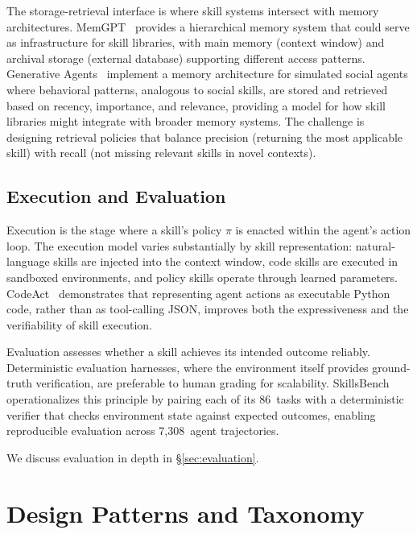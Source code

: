 \documentclass[conference, compsoc]{IEEEtran}
\theoremstyle{plain}
\begin{document}
The storage-retrieval interface is where skill systems intersect with memory architectures. MemGPT~\cite{packer2023memgpt} provides a hierarchical memory system that could serve as infrastructure for skill libraries, with main memory (context window) and archival storage (external database) supporting different access patterns. Generative Agents~\cite{park2023generative} implement a memory architecture for simulated social agents where behavioral patterns, analogous to social skills, are stored and retrieved based on recency, importance, and relevance, providing a model for how skill libraries might integrate with broader memory systems. The challenge is designing retrieval policies that balance precision (returning the most applicable skill) with recall (not missing relevant skills in novel contexts).

\subsection{Execution and Evaluation}
\label{sec:lifecycle:execution}

Execution is the stage where a skill's policy $\pi$ is enacted within the agent's action loop. The execution model varies substantially by skill representation: natural-language skills are injected into the context window, code skills are executed in sandboxed environments, and policy skills operate through learned parameters. CodeAct~\cite{wang2024codeact} demonstrates that representing agent actions as executable Python code, rather than as tool-calling JSON, improves both the expressiveness and the verifiability of skill execution.

Evaluation assesses whether a skill achieves its intended outcome reliably. Deterministic evaluation harnesses, where the environment itself provides ground-truth verification, are preferable to human grading for scalability. SkillsBench~\cite{skillsbench2025} operationalizes this principle by pairing each of its 86~tasks with a deterministic verifier that checks environment state against expected outcomes, enabling reproducible evaluation across 7{,}308~agent trajectories. 

We discuss evaluation in depth in \S\ref{sec:evaluation}.

\section{Design Patterns and Taxonomy}
\label{sec:patterns}
\end{document}

